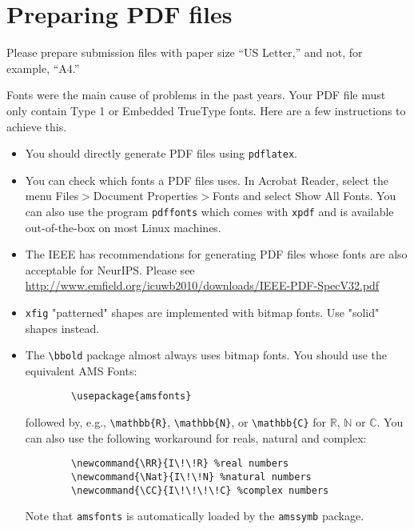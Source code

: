 \documentclass{article}
\begin{document}
	\section{Preparing PDF files}
	
	Please prepare submission files with paper size ``US Letter,'' and not, for
	example, ``A4.''
	
	Fonts were the main cause of problems in the past years. Your PDF file must only
	contain Type 1 or Embedded TrueType fonts. Here are a few instructions to
	achieve this.
	
	\begin{itemize}
		
		\item You should directly generate PDF files using \verb+pdflatex+.
		
		\item You can check which fonts a PDF files uses.  In Acrobat Reader, select the
		menu Files$>$Document Properties$>$Fonts and select Show All Fonts. You can
		also use the program \verb+pdffonts+ which comes with \verb+xpdf+ and is
		available out-of-the-box on most Linux machines.
		
		\item The IEEE has recommendations for generating PDF files whose fonts are also
		acceptable for NeurIPS. Please see
		\url{http://www.emfield.org/icuwb2010/downloads/IEEE-PDF-SpecV32.pdf}
		
		\item \verb+xfig+ "patterned" shapes are implemented with bitmap fonts.  Use
		"solid" shapes instead.
		
		\item The \verb+\bbold+ package almost always uses bitmap fonts.  You should use
		the equivalent AMS Fonts:
		\begin{verbatim}
		\usepackage{amsfonts}
		\end{verbatim}
		followed by, e.g., \verb+\mathbb{R}+, \verb+\mathbb{N}+, or \verb+\mathbb{C}+
		for $\mathbb{R}$, $\mathbb{N}$ or $\mathbb{C}$.  You can also use the following
		workaround for reals, natural and complex:
		\begin{verbatim}
		\newcommand{\RR}{I\!\!R} %real numbers
		\newcommand{\Nat}{I\!\!N} %natural numbers
		\newcommand{\CC}{I\!\!\!\!C} %complex numbers
		\end{verbatim}
		Note that \verb+amsfonts+ is automatically loaded by the \verb+amssymb+ package.
		
	\end{itemize}
	
\end{document}
